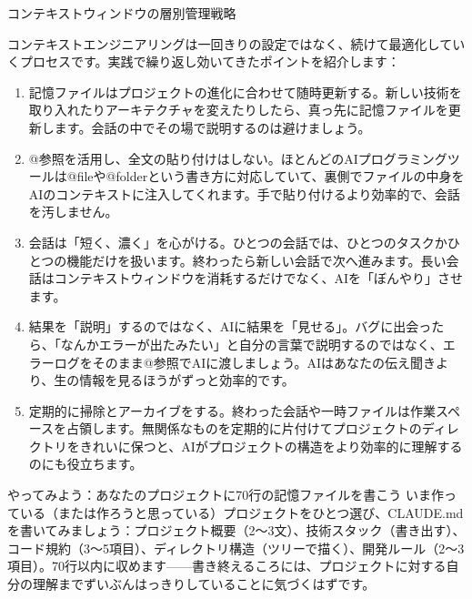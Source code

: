 \begin{center}\small\color{gray}コンテキストウィンドウの層別管理戦略\end{center}


コンテキストエンジニアリングは一回きりの設定ではなく、続けて最適化していくプロセスです。実践で繰り返し効いてきたポイントを紹介します：

\begin{enumerate}
  \item 記憶ファイルはプロジェクトの進化に合わせて随時更新する。新しい技術を取り入れたりアーキテクチャを変えたりしたら、真っ先に記憶ファイルを更新します。会話の中でその場で説明するのは避けましょう。
  \item @参照を活用し、全文の貼り付けはしない。ほとんどのAIプログラミングツールは@fileや@folderという書き方に対応していて、裏側でファイルの中身をAIのコンテキストに注入してくれます。手で貼り付けるより効率的で、会話を汚しません。
  \item 会話は「短く、濃く」を心がける。ひとつの会話では、ひとつのタスクかひとつの機能だけを扱います。終わったら新しい会話で次へ進みます。長い会話はコンテキストウィンドウを消耗するだけでなく、AIを「ぼんやり」させます。
  \item 結果を「説明」するのではなく、AIに結果を「見せる」。バグに出会ったら、「なんかエラーが出たみたい」と自分の言葉で説明するのではなく、エラーログをそのまま@参照でAIに渡しましょう。AIはあなたの伝え聞きより、生の情報を見るほうがずっと効率的です。
  \item 定期的に掃除とアーカイブをする。終わった会話や一時ファイルは作業スペースを占領します。無関係なものを定期的に片付けてプロジェクトのディレクトリをきれいに保つと、AIがプロジェクトの構造をより効率的に理解するのにも役立ちます。
\end{enumerate}

\begin{tcbpractice}{やってみよう：あなたのプロジェクトに70行の記憶ファイルを書こう}
いま作っている（または作ろうと思っている）プロジェクトをひとつ選び、CLAUDE.mdを書いてみましょう：プロジェクト概要（2〜3文）、技術スタック（書き出す）、コード規約（3〜5項目）、ディレクトリ構造（ツリーで描く）、開発ルール（2〜3項目）。70行以内に収めます——書き終えるころには、プロジェクトに対する自分の理解までずいぶんはっきりしていることに気づくはずです。

\end{tcbpractice}

